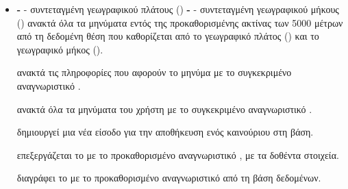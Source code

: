 \begin{itemize}
    \item {}
    \newline \newline
    \textbf{}
    \newline \newline
    \textbf{-} - συντεταγμένη γεωγραφικού πλάτους () \newline 
    \indent
    \textbf{-} - συντεταγμένη γεωγραφικού μήκους ()
    \newline \newline \noindent
    ανακτά όλα τα μηνύματα εντός της προκαθορισμένης ακτίνας των 5000 μέτρων από τη δεδομένη θέση που καθορίζεται από το γεωγραφικό πλάτος () και το γεωγραφικό μήκος ().
    
    \newline \newline
    \textbf{}
    \newline \newline \noindent
    ανακτά τις πληροφορίες που αφορούν το μηνύμα με το συγκεκριμένο αναγνωριστικό .
    
    \newline \newline
    \textbf{}
    \newline \newline \noindent
    ανακτά όλα τα μηνύματα του χρήστη με το συγκεκριμένο αναγνωριστικό .
    
    \newline \newline
    \textbf{}
    \newline \newline \noindent
    δημιουργεί μια νέα είσοδο για την αποθήκευση ενός καινούριου  στη βάση.
    
    \newline \newline
    \textbf{}
    \newline \newline \noindent
    επεξεργάζεται το  με το προκαθορισμένο αναγνωριστικό , με τα δοθέντα στοιχεία.
    
    \newline \newline
    \textbf{}
    \newline \newline \noindent
    διαγράφει το  με το προκαθορισμένο αναγνωριστικό  από τη βάση δεδομένων.
    

\end{itemize}
